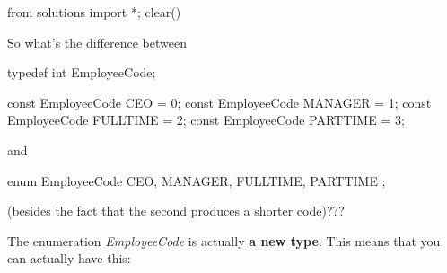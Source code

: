 \begin{python0}
from solutions import *; clear()
\end{python0}

So what's the difference between

\begin{consolethree}[escapeinside=||]
typedef int EmployeeCode;

const EmployeeCode CEO = 0;
const EmployeeCode MANAGER = 1;
const EmployeeCode FULLTIME = 2;
const EmployeeCode PARTTIME = 3;
\end{consolethree}

and

\begin{consolethree}[escapeinside=||]
enum EmployeeCode
{
    CEO, MANAGER, FULLTIME, PARTTIME
};
\end{consolethree}

(besides the fact that the second produces a shorter code)???

The enumeration \textit{EmployeeCode} is actually \textbf{a new
type}. This means that you can actually have this:



